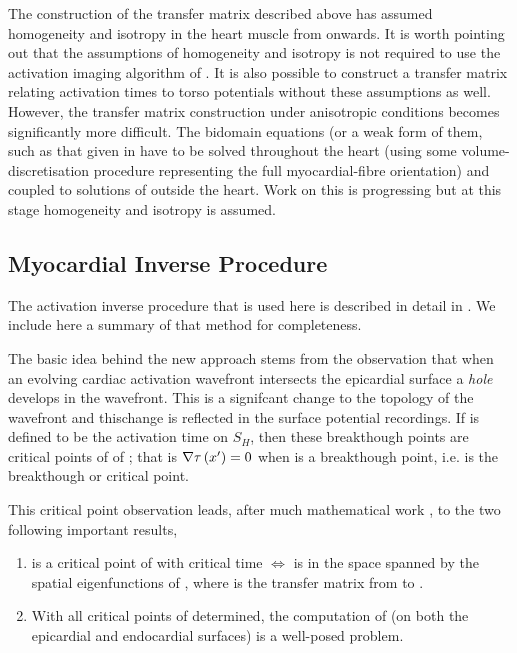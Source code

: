 The construction of the transfer matrix described above has assumed homogeneity and
isotropy in the heart muscle from  onwards. It is worth pointing
out that the assumptions of homogeneity and isotropy is not required to use
the activation imaging algorithm of \cite{huiskamp:1997}.  It is also possible to
construct a transfer matrix relating activation times to torso potentials without
these assumptions as well. However, the transfer matrix construction under
anisotropic conditions becomes significantly more difficult.  The bidomain equations
(or a weak form of them, such as that given in  have to be solved
throughout the heart (using some volume-discretisation procedure representing the
full myocardial-fibre orientation) and coupled to solutions of 
outside the heart. Work on this is progressing \cite{pullan:1998b} but at this
stage homogeneity and isotropy is assumed. 


\subsection{Myocardial Inverse Procedure}

The activation inverse procedure that is used here 
is described in detail in \cite{huiskamp:1988}.  We include here a summary
of that method for completeness. 

The basic idea behind the new approach stems from the observation that when
an  evolving cardiac activation wavefront intersects the epicardial surface
a \emph{hole} develops in the wavefront. This is a signifcant change to the
topology of the wavefront and thischange is reflected in the surface
potential recordings. If  is defined to be the
activation time on $S_H$, then these breakthough points are critical
points of of ; that is $ \nabla   \tau\left( x' \right) =0$ when
\vect{\critpoint} is a breakthough point, i.e. \activfn{\critpoint} is the
breakthough or critical point.

This critical point observation leads, after much mathematical work
\cite{greensite:1995}, to the two following important results,

\begin{enumerate}
        \item \vect{\critpoint} is a critical point of  with critical time
                \activfn{\critpoint} $\Longleftrightarrow$  is in
                the space spanned by the spatial eigenfunctions of \bodypot, where \transfer is
                the transfer matrix from \tranpot to \bodypot.
        \item With all critical points of  determined, the
                computation of  (on both the epicardial and endocardial
                surfaces) is a well-posed problem.
\end{enumerate}

